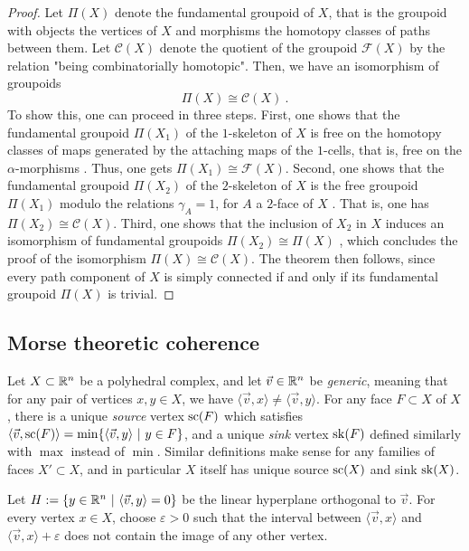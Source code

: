 \begin{proof}
    Let $\Pi(X)$ denote the fundamental groupoid of $X$, that is the groupoid with objects the vertices of $X$ and morphisms the homotopy classes of paths between them.
    Let $\mathcal{C}(X)$ denote the quotient of the groupoid $\mathcal{F}(X)$ by the relation "being combinatorially homotopic". 
    Then, we have an isomorphism of groupoids \[ \Pi(X) \cong \mathcal{C}(X) \ . \]
    To show this, one can proceed in three steps. 
    First, one shows that the fundamental groupoid $\Pi(X_1)$ of the $1$-skeleton of $X$ is free on the homotopy classes of maps generated by the attaching maps of the $1$-cells, that is, free on the $\alpha$-morphisms \cite[9.1.5]{Brown2006}.
    Thus, one gets $\Pi(X_1) \cong \mathcal{F}(X)$. 
    Second, one shows that the fundamental groupoid $\Pi(X_2)$ of the $2$-skeleton of $X$ is the free groupoid $\Pi(X_1)$ modulo the relations $\gamma_A=1$, for $A$ a $2$-face of $X$ \cite[9.1.6]{Brown2006}. 
    That is, one has $\Pi(X_2) \cong \mathcal{C}(X)$.
    Third, one shows that the inclusion of $X_2$ in $X$ induces an isomorphism of fundamental groupoids $\Pi(X_2) \cong \Pi(X)$ \cite[9.1.7]{Brown2006}, which concludes the proof of the isomorphism $\Pi(X) \cong \mathcal{C}(X)$.
    The theorem then follows, since every path component of $X$ is simply connected if and only if its fundamental groupoid $\Pi(X)$ is trivial.  
\end{proof}

\subsection{Morse theoretic coherence}

Let $X\subset \mathbb R^n$ be a polyhedral complex, and let $\vec v \in \mathbb R^n$ be \emph{generic}, meaning that for any pair of vertices $x,y \in X$, we have $\langle \vec v , x \rangle \neq \langle \vec v, y\rangle$.  
For any face $F \subset X$ of $X$, there is a unique \emph{source} vertex $\mathrm{sc}(F)$ which satisfies $\langle \vec v , \mathrm{sc}(F) \rangle = \min \{\langle \vec v , y \rangle \ | \ y \in F \}$, and a unique \emph{sink} vertex $\mathrm{sk}(F)$ defined similarly with $\max$ instead of $\min$.
Similar definitions make sense for any families of faces $X' \subset X$, and in particular $X$ itself has unique source $\mathrm{sc}(X)$ and sink $\mathrm{sk}(X)$. 

Let $H:=\{y \in \mathbb R^n \ | \ \langle \vec v , y \rangle = 0\}$ be the linear hyperplane orthogonal to $\vec v$.  
For every vertex $x \in X$, choose $\varepsilon >0$ such that the interval between $\langle \vec v , x \rangle$ and $\langle \vec v , x \rangle + \varepsilon$ does not contain the image of any other vertex. 

